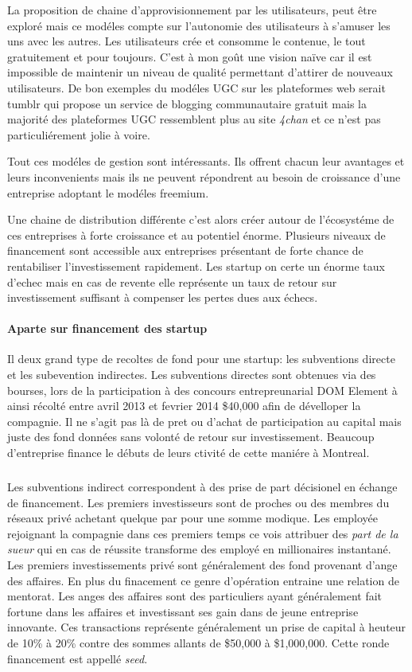 \documentclass[11pt, a4paper ]{article}
\begin{document}
\begin{spacing}{1.5}
La proposition de chaine d'approvisionnement par les utilisateurs, peut être exploré mais ce modéles compte sur l'autonomie des utilisateurs à s'amuser les uns avec les autres. Les utilisateurs crée et consomme le contenue, le tout gratuitement et pour toujours. C'est à mon goût une vision naïve car il est impossible de maintenir un niveau de qualité permettant d'attirer de nouveaux utilisateurs. De bon exemples du modéles UGC sur les plateformes web serait tumblr qui propose un service de blogging communautaire gratuit mais la majorité des plateformes UGC ressemblent plus au site \emph{4chan} et ce n'est pas particuliérement jolie à voire.

Tout ces modéles de gestion sont intéressants. Ils offrent chacun leur avantages et leurs inconvenients mais ils ne peuvent répondrent au besoin de croissance d'une entreprise adoptant le modéles freemium.

Une chaine de distribution différente c'est alors créer autour de l'écosystéme de ces entreprises à forte croissance et au potentiel énorme. Plusieurs niveaux de financement sont accessible aux entreprises présentant de forte chance de rentabiliser l'investissement rapidement. Les startup on certe un énorme taux d'echec mais en cas de revente elle représente un taux de retour sur investissement suffisant à compenser les pertes dues aux échecs.

		\paragraph{Aparte sur financement des startup}

Il deux grand type de recoltes de fond pour une startup: les subventions directe et les subevention indirectes. 
Les subventions directes sont obtenues via des bourses, lors de la participation à des concours entrepreunarial DOM Element à ainsi récolté entre avril 2013 et fevrier 2014 \$40,000 afin de dévelloper la compagnie. Il ne s'agit pas là de pret ou d'achat de participation au capital mais juste des fond données sans volonté de retour sur investissement. Beaucoup d'entreprise finance le débuts de leurs ctivité de cette maniére à Montreal.

\subparagraph{}
Les subventions indirect correspondent à des prise de part décisionel en échange de financement. Les premiers investisseurs sont de proches ou des membres du réseaux privé achetant quelque par pour une somme modique. Les employée rejoignant la compagnie dans ces premiers temps ce vois attribuer des \emph{part de la sueur} qui en cas de réussite transforme des employé en millionaires instantané.
Les premiers investissements privé sont généralement des fond provenant d'ange des affaires. En plus du finacement ce genre d'opération entraine une relation de mentorat. Les anges des affaires sont des particuliers ayant généralement fait fortune dans les affaires et investissant ses gain dans de jeune entreprise innovante. Ces transactions représente généralement un prise de capital à heuteur de 10\% à 20\% contre des sommes allants de \$50,000 à \$1,000,000. Cette ronde financement est appellé \emph{seed}.


\end{spacing}
\end{document}
